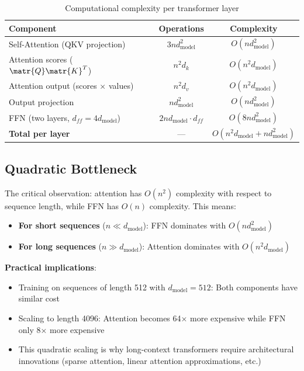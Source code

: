 \begin{table}[h!]
  \centering
  \caption{Computational complexity per transformer layer}
  \begin{tabular}{lcc}
    \toprule
    \textbf{Component} & \textbf{Operations} & \textbf{Complexity} \\
    \midrule
    Self-Attention (QKV projection) & $3nd_{\text{model}}^2$ & $O(nd_{\text{model}}^2)$ \\
    Attention scores ($\matr{Q}\matr{K}^T$) & $n^2d_k$ & $O(n^2d_{\text{model}})$ \\
    Attention output (scores $\times$ values) & $n^2d_v$ & $O(n^2d_{\text{model}})$ \\
    Output projection & $nd_{\text{model}}^2$ & $O(nd_{\text{model}}^2)$ \\
    FFN (two layers, $d_{ff} = 4d_{\text{model}}$) & $2nd_{\text{model}} \cdot d_{ff}$ & $O(8nd_{\text{model}}^2)$ \\
    \midrule
    \textbf{Total per layer} & --- & $O(n^2d_{\text{model}} + nd_{\text{model}}^2)$ \\
    \bottomrule
  \end{tabular}
\end{table}

\subsection{Quadratic Bottleneck}

The critical observation: attention has $O(n^2)$ complexity with respect to sequence length, while FFN has $O(n)$ complexity. This means:

\begin{itemize}
  \item \textbf{For short sequences} ($n \ll d_{\text{model}}$): FFN dominates with $O(nd_{\text{model}}^2)$
  \item \textbf{For long sequences} ($n \gg d_{\text{model}}$): Attention dominates with $O(n^2d_{\text{model}})$
\end{itemize}

\textbf{Practical implications}:
\begin{itemize}
  \item Training on sequences of length 512 with $d_{\text{model}}=512$: Both components have similar cost
  \item Scaling to length 4096: Attention becomes 64× more expensive while FFN only 8× more expensive
  \item This quadratic scaling is why long-context transformers require architectural innovations (sparse attention, linear attention approximations, etc.)
\end{itemize}

